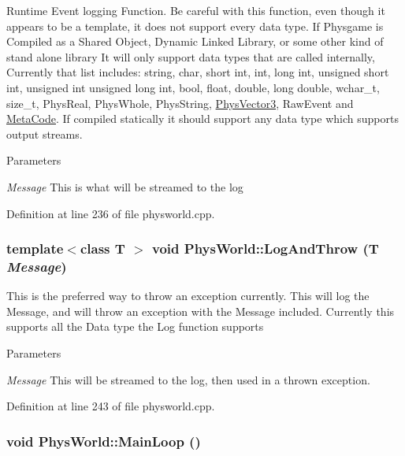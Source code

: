 Runtime Event logging Function. Be careful with this function, even though it appears to be a template, it does not support every data type. If Physgame is Compiled as a Shared Object, Dynamic Linked Library, or some other kind of stand alone library It will only support data types that are called internally, Currently that list includes: string, char, short int, int, long int, unsigned short int, unsigned int unsigned long int, bool, float, double, long double, wchar\_\-t, size\_\-t, PhysReal, PhysWhole, PhysString, \hyperlink{classPhysVector3}{PhysVector3}, RawEvent and \hyperlink{classMetaCode}{MetaCode}. If compiled statically it should support any data type which supports output streams. 
\begin{DoxyParams}{Parameters}
\item[{\em Message}]This is what will be streamed to the log \end{DoxyParams}


Definition at line 236 of file physworld.cpp.\hypertarget{classPhysWorld_a1c2aeaed2a89821a4545db854da33ab8}{
\subsubsection[{LogAndThrow}]{\setlength{\rightskip}{0pt plus 5cm}template$<$class T $>$ void PhysWorld::LogAndThrow (T {\em Message})}}
\label{db/df5/classPhysWorld_a1c2aeaed2a89821a4545db854da33ab8}


This is the preferred way to throw an exception currently. This will log the Message, and will throw an exception with the Message included. Currently this supports all the Data type the Log function supports 
\begin{DoxyParams}{Parameters}
\item[{\em Message}]This will be streamed to the log, then used in a thrown exception. \end{DoxyParams}


Definition at line 243 of file physworld.cpp.\hypertarget{classPhysWorld_ad41cad0347b6f5ba7ec05568aaffa514}{
\subsubsection[{MainLoop}]{\setlength{\rightskip}{0pt plus 5cm}void PhysWorld::MainLoop ()}}
\label{db/df5/classPhysWorld_ad41cad0347b6f5ba7ec05568aaffa514}



